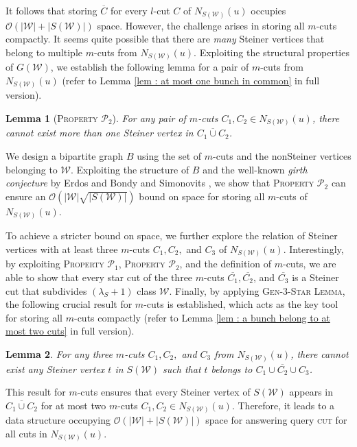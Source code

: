 \documentclass[letterpaper,11pt]{article}
\newtheorem{lemma}{Lemma}[]
\begin{document}
\noindent
It follows that storing $\overline{C}$ for every $l$-cut $C$ of $N_{S({\mathcal W})}(u)$ occupies ${\mathcal O}(|{\mathcal W}|+|S({\mathcal W})|)$ space. However, the challenge arises in storing all $m$-cuts compactly. It seems quite possible that there are
\textit{many} Steiner vertices that belong to multiple $m$-cuts from $N_{S({\mathcal W})}(u)$. Exploiting the structural properties of $G({\mathcal W})$, we establish the following lemma for a pair of $m$-cuts from $N_{S({\mathcal W})}(u)$  (refer to Lemma \ref{lem : at most one bunch in common} in full version).\begin{lemma}[\textsc{Property ${\mathcal P}_2$}] \label{lem : overview : property p2} For any pair of $m$-cuts $C_1,C_2\in N_{S({\mathcal W})}(u)$, there cannot exist more than one Steiner vertex in $\overline{C_1\cup C_2}$.
\end{lemma}
We design a bipartite graph $B$ using the set of $m$-cuts and the nonSteiner vertices belonging to ${\mathcal W}$. Exploiting the structure of $B$ and the well-known \textit{girth conjecture} by Erdos \cite{erdos1964extremal} and Bondy and Simonovits \cite{bondy1974cycles}, we show that \textsc{Property ${\mathcal P}_2$} can ensure an ${\mathcal O}(|{\mathcal W}|\sqrt{|S({\mathcal W})|})$ bound on space for storing all $m$-cuts of $N_{S({\mathcal W})}(u)$. 



To achieve a stricter bound on space, we further explore the relation of Steiner vertices with at least three $m$-cuts $C_1,C_2,$ and $C_3$ of $N_{S({\mathcal W})}(u)$.
Interestingly, by exploiting \textsc{Property ${\mathcal P}_1$},  \textsc{Property ${\mathcal P}_2$}, and the definition of $m$-cuts, we are able to show that every star cut of the three $m$-cuts $\overline{C_1}, \overline{C_2}$, and $\overline{C_3}$ is a Steiner cut that subdivides $(\lambda_S+1)$ class ${\mathcal W}$. Finally, by applying \textsc{Gen-3-Star Lemma}, 
the following crucial result for $m$-cuts is established, which acts as the key tool for storing all $m$-cuts compactly (refer to Lemma \ref{lem : a bunch belong to at most two cuts} in full version).  
\begin{lemma}
    For any three $m$-cuts $C_1,C_2,$ and $C_3$ from $N_{S({\mathcal W})}(u)$, there cannot exist any Steiner vertex $t$ in $S({\mathcal W})$ such that $t$ belongs to $\overline{C_1\cup C_2\cup C_3}$.
\end{lemma}
This result for $m$-cuts ensures that every Steiner vertex of $S({\mathcal W})$ appears in $\overline{C_1\cup C_2}$ for at most two $m$-cuts $C_1,C_2\in N_{S({\mathcal W})}(u)$. Therefore, it leads to a data structure occupying ${\mathcal O}(|{\mathcal W}|+|S({\mathcal W})|)$ space  for answering query \textsc{cut} for all cuts in $N_{S({\mathcal W})}(u)$. 
\end{document}
